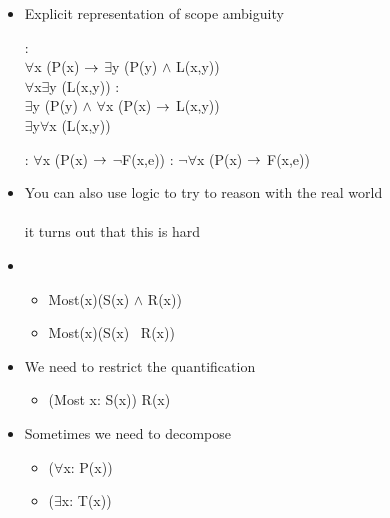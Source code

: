 \documentclass[a4paper,landscape,headrule,footrule,xetex]{foils}
\begin{document}
\begin{itemize}
\item Explicit representation of scope ambiguity
  \begin{exe}
    \ex {}
    \begin{xlist}
          \ex {}:  
          \\ $\forall$x (P(x) $\rightarrow$ $\exists$y (P(y) $\wedge$ L(x,y))
          \\ $\forall$x$\exists$y (L(x,y))
          \ex {}: 
          \\   $\exists$y (P(y) $\wedge$ $\forall$x (P(x) $\rightarrow$ L(x,y))
          \\  $\exists$y$\forall$x (L(x,y))
    \end{xlist}
    \ex {}
    \begin{xlist}
          \ex {}:  
          $\forall$x (P(x)  $\rightarrow$  $\neg$F(x,e))
          \ex {}:  
          $\neg\forall$x (P(x)  $\rightarrow$  F(x,e))
    \end{xlist}
  \end{exe}
\item You can also use logic to try to reason with the real world
   \\ 
   \\ it turns out that this is hard
\end{itemize}



\begin{itemize}
\item {}
  \begin{itemize}
  \item Most(x)(S(x) $\wedge$ R(x))
    \\ 
  \item Most(x)(S(x) \into\  R(x))
    \\ 
  \end{itemize}
\item We need to restrict the quantification
  \begin{itemize}
  \item (Most x: S(x)) R(x)
  \end{itemize}
\item Sometimes we need to decompose
  \begin{itemize}
  \item {} ($\forall$x: P(x))
  \item {} ($\exists$x: T(x))
  \end{itemize}
\end{itemize}
\end{document}
